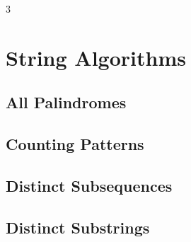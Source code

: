 \documentclass[8pt]{extarticle}
\begin{document}
\begin{multicols*}{3}

\section{String Algorithms}

\subsection{All Palindromes}
\begin{caixaenunciado}

\end{caixaenunciado}
\vspace{0.3cm}


\subsection{Counting Patterns}
\begin{caixaenunciado}

\end{caixaenunciado}
\vspace{0.3cm}


\subsection{Distinct Subsequences}
\begin{caixaenunciado}

\end{caixaenunciado}
\vspace{0.3cm}


\subsection{Distinct Substrings}
\begin{caixaenunciado}

\end{caixaenunciado}
\vspace{0.3cm}



\end{multicols*}
\end{document}
